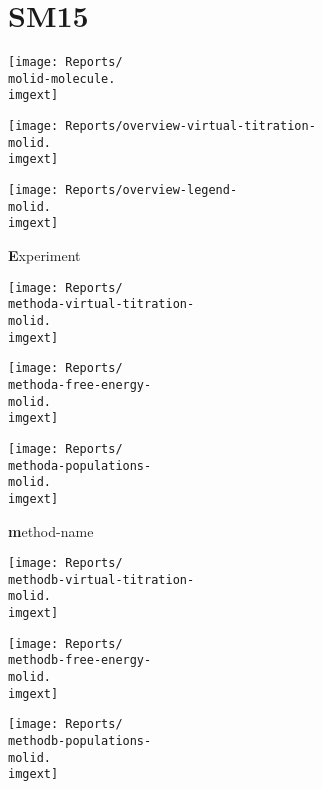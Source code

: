 \documentclass[9pt]{standalone}
\begin{document}
\newcommand{\molid}{SM15}
\newcommand{\imgext}{pdf}
\newcommand{\methoda}{Experiment}
\newcommand{\methodb}{method-name}
\section{\molid}
\noindent 
\begin{minipage}[s]{0.35\textwidth}\centering
\texttt{[image: Reports/\\molid-molecule.\\imgext]}
\end{minipage}
\begin{minipage}[s]{0.35\textwidth}
\texttt{[image: Reports/overview-virtual-titration-\\molid.\\imgext]}
\end{minipage}
\begin{minipage}[s]{0.23\textwidth}
\texttt{[image: Reports/overview-legend-\\molid.\\imgext]}
\end{minipage}

\begin{minipage}[s]{\textwidth}\centering
{\textbf \methoda}
\end{minipage}

\noindent
\begin{minipage}[s]{0.33\textwidth}\centering
\texttt{[image: Reports/\\methoda-virtual-titration-\\molid.\\imgext]}
\end{minipage}
\begin{minipage}[s]{0.33\textwidth}
\texttt{[image: Reports/\\methoda-free-energy-\\molid.\\imgext]}
\end{minipage}
\begin{minipage}[s]{0.33\textwidth}
\texttt{[image: Reports/\\methoda-populations-\\molid.\\imgext]}
\end{minipage}

\begin{minipage}[s]{\textwidth}\centering
{\textbf \methodb}
\end{minipage}

\noindent
\begin{minipage}[s]{0.33\textwidth}\centering
\texttt{[image: Reports/\\methodb-virtual-titration-\\molid.\\imgext]}
\end{minipage}
\begin{minipage}[s]{0.33\textwidth}
\texttt{[image: Reports/\\methodb-free-energy-\\molid.\\imgext]}
\end{minipage}
\begin{minipage}[s]{0.33\textwidth}
\texttt{[image: Reports/\\methodb-populations-\\molid.\\imgext]}
\end{minipage}
\end{document}
